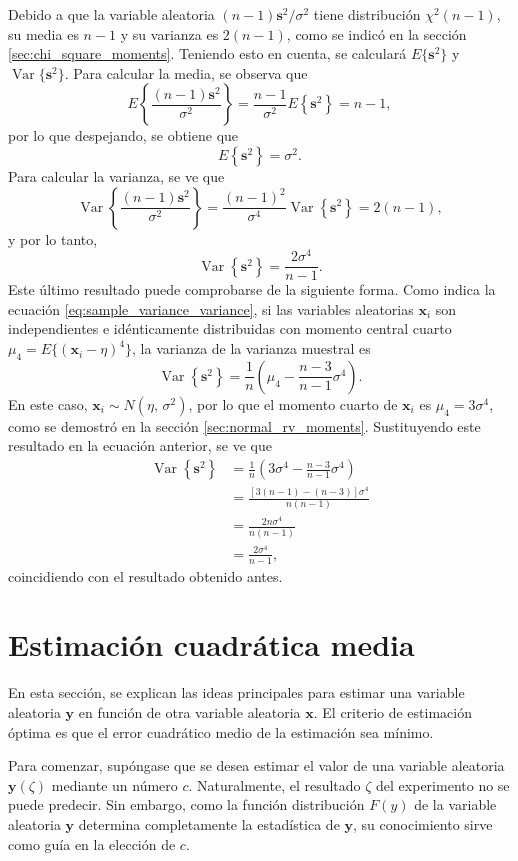 \documentclass[a4paper]{report}
\newcommand{\x}{\mathbf{x}}
\newcommand{\y}{\mathbf{y}}
\begin{document}
Debido a que la variable aleatoria \((n-1)\mathbf{s}^2/\sigma^2\) tiene distribución \(\chi^2(n-1)\), su media es \(n-1\) y su varianza es \(2(n-1)\), como se indicó en la sección \ref{sec:chi_square_moments}. Teniendo esto en cuenta, se calculará \(E\{\mathbf{s}^2\}\) y \(\operatorname{Var}\{\mathbf{s}^2\}\). Para calcular la media, se observa que
\[
 E\left\{\frac{(n-1)\mathbf{s}^2}{\sigma^2}\right\}=\frac{n-1}{\sigma^2}E\left\{\mathbf{s}^2\right\}=n-1,
\]
por lo que despejando, se obtiene que
\[
 E\left\{\mathbf{s}^2\right\}=\sigma^2.
\]
Para calcular la varianza, se ve que
\[
 \operatorname{Var}\left\{\frac{(n-1)\mathbf{s}^2}{\sigma^2}\right\}=\frac{(n-1)^2}{\sigma^4}\operatorname{Var}\left\{\mathbf{s}^2\right\}=2(n-1),
\]
y por lo tanto,
\[
 \operatorname{Var}\left\{\mathbf{s}^2\right\}=\frac{2\sigma^4}{n-1}.
\]
Este último resultado puede comprobarse de la siguiente forma. Como indica la ecuación \ref{eq:sample_variance_variance}, si las variables aleatorias \(\x_i\) son independientes e idénticamente distribuidas con momento central cuarto \(\mu_4=E\{(\x_i-\eta)^4\}\), la varianza de la varianza muestral es
\[
 \operatorname{Var}\left\{\mathbf{s}^2\right\}=\frac{1}{n}\left(\mu_4-\frac{n-3}{n-1}\sigma^4\right).
\]
En este caso, \(\x_i\sim N(\eta,\,\sigma^2)\), por lo que el momento cuarto de \(\x_i\) es \(\mu_4=3\sigma^4\), como se demostró en la sección \ref{sec:normal_rv_moments}. Sustituyendo este resultado en la ecuación anterior, se ve que
\begin{align*}
 \operatorname{Var}\left\{\mathbf{s}^2\right\}&=\frac{1}{n}\left(3\sigma^4-\frac{n-3}{n-1}\sigma^4\right)\\
   &=\frac{[3(n-1)-(n-3)]\sigma^4}{n(n-1)}\\
   &=\frac{2n\sigma^4}{n(n-1)}\\
   &=\frac{2\sigma^4}{n-1},
\end{align*}
coincidiendo con el resultado obtenido antes.

\section{Estimación cuadrática media}\label{sec:mean_square_estimation}

En esta sección, se explican las ideas principales para estimar una variable aleatoria \(\y\) en función de otra variable aleatoria \(\x\). El criterio de estimación óptima es que el error cuadrático medio de la estimación sea mínimo.

Para comenzar, supóngase que se desea estimar el valor de una variable aleatoria \(\y(\zeta)\) mediante un número \(c\). Naturalmente, el resultado \(\zeta\) del experimento no se puede predecir. Sin embargo, como la función distribución \(F(y)\) de la variable aleatoria \(\y\) determina completamente la estadística de \(\y\), su conocimiento sirve como guía en la elección de \(c\).
\end{document}
